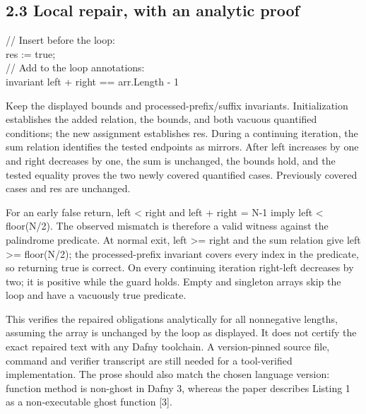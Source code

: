 \documentclass[10pt]{article}
\begin{document}
\subsection*{2.3 Local repair, with an analytic proof}
{\ttfamily\footnotesize // Insert before the loop:\\
res := true;\\
// Add to the loop annotations:\\
invariant left + right == arr.Length - 1}\par
Keep the displayed bounds and processed-prefix/suffix invariants. Initialization establishes the added relation, the bounds, and both vacuous quantified conditions; the new assignment establishes res. During a continuing iteration, the sum relation identifies the tested endpoints as mirrors. After left increases by one and right decreases by one, the sum is unchanged, the bounds hold, and the tested equality proves the two newly covered quantified cases. Previously covered cases and res are unchanged.\par
For an early false return, left < right and left + right = N-1 imply left < floor(N/2). The observed mismatch is therefore a valid witness against the palindrome predicate. At normal exit, left >= right and the sum relation give left >= floor(N/2); the processed-prefix invariant covers every index in the predicate, so returning true is correct. On every continuing iteration right-left decreases by two; it is positive while the guard holds. Empty and singleton arrays skip the loop and have a vacuously true predicate.\par
This verifies the repaired obligations analytically for all nonnegative lengths, assuming the array is unchanged by the loop as displayed. It does not certify the exact repaired text with any Dafny toolchain. A version-pinned source file, command and verifier transcript are still needed for a tool-verified implementation. The prose should also match the chosen language version: function method is non-ghost in Dafny 3, whereas the paper describes Listing 1 as a non-executable ghost function [3].\par
\end{document}
